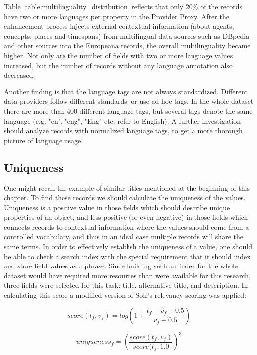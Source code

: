 Table \ref{table:multilinguality_distribution} reflects that only 20\% of the records have two or more languages per property in the Provider Proxy. After the enhancement process injects external contextual information (about agents, concepts, places and timespans) from multilingual data sources such as DBpedia and other sources into the Europeana records, the overall multilinguality became higher. Not only are the number of fields with two or more language values increased, but the number of records without any language annotation also decreased.

Another finding is that the language tags are not always standardized. Different data providers follow different standards, or use ad-hoc tags. In the whole dataset there are more than 400 different language tags, but several tags denote the same language (e.g. "en", "eng", "Eng" etc. refer to English). A further investigation should analyze records with normalized language tags, to get a more thorough picture of language usage.

\subsection{Uniqueness}

One might recall the example of similar titles mentioned at the beginning of this chapter. To find those records we should calculate the uniqueness of the values. Uniqueness is a positive value in those fields which should describe unique properties of an object, and less positive (or even negative) in those fields which connects records to contextual information where the values should come from a controlled vocabulary, and thus in an ideal case multiple records will share the same terms. In order to effectively establish the uniqueness of a value, one should be able to check a search index with the special requirement that it should index and store field values as a phrase. Since building such an index for the whole dataset would have required more resources than were available for this research, three fields were selected for this task: title, alternative title, and description. In calculating this score a modified version of Solr's relevancy scoring was applied:

\begin{equation}
score(t_f, v_f) = log\left(1 + \frac{t_f - v_f + 0.5}{v_f + 0.5}\right)
\end{equation}

\begin{equation}
uniqueness_f = \left(\frac{score(t_f, v_f)}{score(t_f, 1.0}\right)^3
\end{equation}

